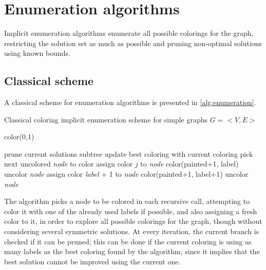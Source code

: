 
\section{Enumeration algorithms}
\label{sec:heur}

Implicit enumeration algorithms enumerate all possible colorings for the graph, restricting the solution set as much as possible and pruning non-optimal solutions using known bounds. 

\subsection{Classical scheme}

A classical scheme for enumeration algorithms is presented in \ref{alg:enumeration}.

\begin{algorithm}
\caption{Classical coloring implicit enumeration scheme for simple graphs $G = <V,E>$}
\label{alg:enumeration}

\begin{algorithmic}
\CALL color(0,1)

		\STATE prune current solutions subtree
		\STATE update best coloring with current coloring
	\ELSE
		\STATE pick next uncolored \textit{node} to color		
				\STATE assign color $j$ to \textit{node}
				\CALL color(painted+1, label)
				\STATE uncolor \textit{node}
			\ENDIF
		\ENDFOR
		\STATE assign color \textit{label} + 1 to \textit{node}
		\CALL color(painted+1, label+1)
		\STATE uncolor \textit{node}
	\ENDIF
\ENDPROC

\end{algorithmic}
\end{algorithm}

The algorithm picks a node to be colored in each recursive call, attempting to color it with one of the already used labels if possible, and also  assigning a fresh color to it, in order to explore all possible colorings for the graph, though without considering several symmetric solutions. At every iteration, the current branch is checked if it can be pruned; this can be done if the current coloring is using as many labels as the best coloring found by the algorithm, since it implies that the best solution cannot be improved using the current one.


